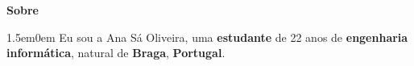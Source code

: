 \noindent\textbf{Sobre}
\noindent\hrulefill
\vspace{0.25em}
\begin{adjustwidth}{1.5em}{0em}
Eu sou a Ana Sá Oliveira, uma \textbf{estudante} de 22 anos
de \textbf{engenharia informática}, natural de \textbf{Braga}, \textbf{Portugal}.
\end{adjustwidth}
\vspace{0.25em}